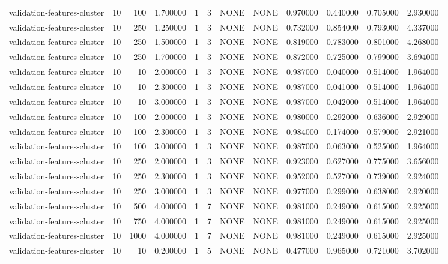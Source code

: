 \begin{tabular}{lrrrllllrrrr}
validation-features-cluster & 10 & 100 & 1.700000 & 1 & 3 & NONE & NONE & 0.970000 & 0.440000 & 0.705000 & 2.930000 \\
validation-features-cluster & 10 & 250 & 1.250000 & 1 & 3 & NONE & NONE & 0.732000 & 0.854000 & 0.793000 & 4.337000 \\
validation-features-cluster & 10 & 250 & 1.500000 & 1 & 3 & NONE & NONE & 0.819000 & 0.783000 & 0.801000 & 4.268000 \\
validation-features-cluster & 10 & 250 & 1.700000 & 1 & 3 & NONE & NONE & 0.872000 & 0.725000 & 0.799000 & 3.694000 \\
validation-features-cluster & 10 & 10 & 2.000000 & 1 & 3 & NONE & NONE & 0.987000 & 0.040000 & 0.514000 & 1.964000 \\
validation-features-cluster & 10 & 10 & 2.300000 & 1 & 3 & NONE & NONE & 0.987000 & 0.041000 & 0.514000 & 1.964000 \\
validation-features-cluster & 10 & 10 & 3.000000 & 1 & 3 & NONE & NONE & 0.987000 & 0.042000 & 0.514000 & 1.964000 \\
validation-features-cluster & 10 & 100 & 2.000000 & 1 & 3 & NONE & NONE & 0.980000 & 0.292000 & 0.636000 & 2.929000 \\
validation-features-cluster & 10 & 100 & 2.300000 & 1 & 3 & NONE & NONE & 0.984000 & 0.174000 & 0.579000 & 2.921000 \\
validation-features-cluster & 10 & 100 & 3.000000 & 1 & 3 & NONE & NONE & 0.987000 & 0.063000 & 0.525000 & 1.964000 \\
validation-features-cluster & 10 & 250 & 2.000000 & 1 & 3 & NONE & NONE & 0.923000 & 0.627000 & 0.775000 & 3.656000 \\
validation-features-cluster & 10 & 250 & 2.300000 & 1 & 3 & NONE & NONE & 0.952000 & 0.527000 & 0.739000 & 2.924000 \\
validation-features-cluster & 10 & 250 & 3.000000 & 1 & 3 & NONE & NONE & 0.977000 & 0.299000 & 0.638000 & 2.920000 \\
validation-features-cluster & 10 & 500 & 4.000000 & 1 & 7 & NONE & NONE & 0.981000 & 0.249000 & 0.615000 & 2.925000 \\
validation-features-cluster & 10 & 750 & 4.000000 & 1 & 7 & NONE & NONE & 0.981000 & 0.249000 & 0.615000 & 2.925000 \\
validation-features-cluster & 10 & 1000 & 4.000000 & 1 & 7 & NONE & NONE & 0.981000 & 0.249000 & 0.615000 & 2.925000 \\
validation-features-cluster & 10 & 10 & 0.200000 & 1 & 5 & NONE & NONE & 0.477000 & 0.965000 & 0.721000 & 3.702000 \\

\end{tabular}
